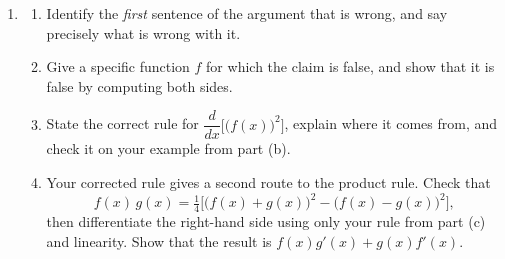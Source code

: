 \documentclass[11pt]{article}
\begin{document}
\begin{enumerate}[resume]
\item[]
\begin{enumerate}
\item Identify the \emph{first} sentence of the argument that is wrong, and say precisely
what is wrong with it.

\item Give a specific function $f$ for which the claim is false, and show that it is false
by computing both sides.

\item State the correct rule for $\dfrac{d}{dx}\Big[\big(f(x)\big)^2\Big]$, explain where it
comes from, and check it on your example from part (b).

\item Your corrected rule gives a second route to the product rule. Check that
\[
f(x)\,g(x) = \tfrac14\Big[\big(f(x)+g(x)\big)^2 - \big(f(x)-g(x)\big)^2\Big],
\]
then differentiate the right-hand side using only your rule from part (c) and linearity.
Show that the result is $f(x)g'(x) + g(x)f'(x)$.
\end{enumerate}
\end{enumerate}
\end{document}
